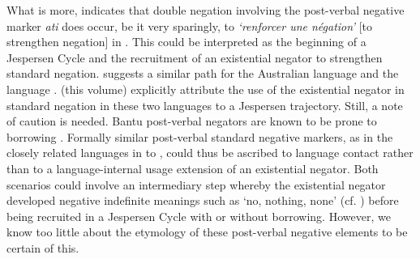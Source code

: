 \documentclass[output=paper]{langscibook}
\begin{document}
\z\z
%
What is more, \citet[378]{Mertens1938} indicates that double negation
involving the post-verbal negative marker \textit{ati} does occur, be it
very sparingly, to \textit{`renforcer une n{\'e}gation'} [to strengthen
negation] in . This could be interpreted as the beginning of a
Jespersen Cycle and the recruitment of an existential negator to strengthen
standard negation. \citet{Croft1991} suggests a similar path for the
Australian language  and the  language .
\citet{AuweraKrasnoukhova2019} (this volume) %
explicitly attribute the use of the
existential negator in standard negation in these two languages to a
Jespersen trajectory. Still, a note of caution is needed. Bantu post-verbal
negators are known to be prone to borrowing \citep[180]{Nurse2008}.
Formally similar post-verbal standard negative markers, as in the closely
related languages in  to
, could thus be ascribed to language contact
rather than to a language-internal usage extension of an existential
negator. Both scenarios could involve an intermediary step whereby the
existential negator developed negative indefinite meanings such as `no,
nothing, none' (cf. ) before being recruited in a Jespersen Cycle with or without borrowing. However, we know too little about the etymology of these post-verbal negative elements to be certain of this.
\end{document}
